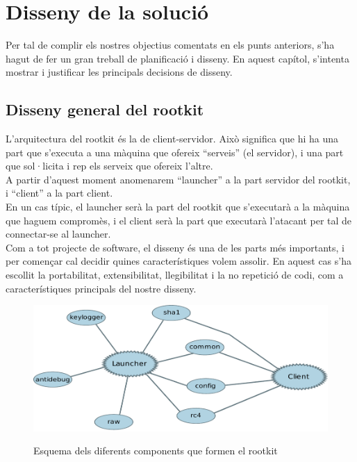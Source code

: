 \chapter{Disseny de la solució}

Per tal de complir els nostres objectius comentats en els punts anteriors, s'ha hagut de fer
un gran treball de planificació i disseny. En aquest capítol, s'intenta mostrar i justificar 
les principals decisions de disseny.

\section{Disseny general del rootkit}

L'arquitectura del rootkit és la de client-servidor. Això significa que hi ha una part que 
s'executa a una màquina que ofereix ``serveis'' (el servidor), i una part que sol·licita i
rep els serveix que ofereix l'altre. \\

A partir d'aquest moment anomenarem ``launcher'' a la part servidor del rootkit, i ``client''
a la part client. \\

En un cas típic, el launcher serà la part del rootkit que s'executarà a la màquina que haguem 
compromès, i el client serà la part que executarà l'atacant per tal de connectar-se al launcher. \\

Com a tot projecte de software, el disseny és una de les parts més importants, i per començar 
cal decidir quines característiques volem assolir. En aquest cas s'ha escollit la portabilitat, 
extensibilitat, llegibilitat i la no repetició de codi, com a característiques principals del 
nostre disseny. \\

\begin{figure}[htp]
    \centering
        \includegraphics[scale=0.7,keepaspectratio]{diagrames/solutionDesignModules.pdf} \\
    \caption{Esquema dels diferents components que formen el rootkit}
    \label{fig:rootkitModules}
\end{figure}

